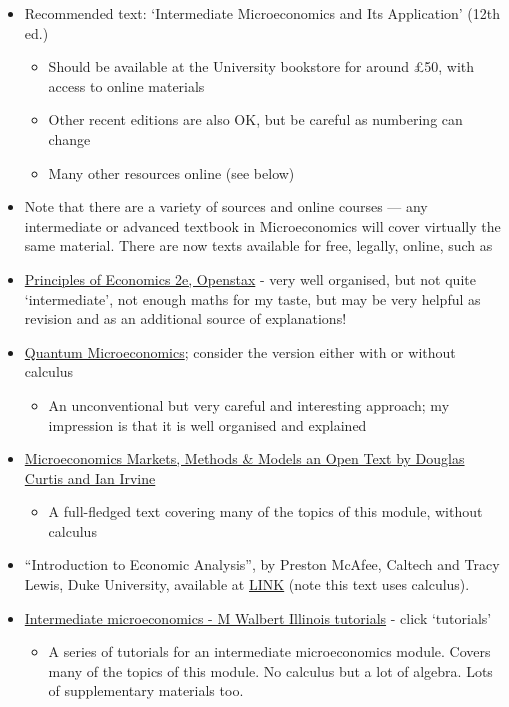 \documentclass[]{article}
\providecommand{\tightlist}{%
  \setlength{\itemsep}{0pt}\setlength{\parskip}{0pt}}
\begin{document}
\begin{itemize}
\item
  Recommended text: `Intermediate Microeconomics and Its Application'
  (12th ed.)

  \begin{itemize}
  \tightlist
  \item
    Should be available at the University bookstore for around
    \pounds50, with access to online materials
  \item
    Other recent editions are also OK, but be careful as numbering can
    change
  \item
    Many other resources online (see below)
  \end{itemize}
\item
  Note that there are a variety of sources and online courses --- any
  intermediate or advanced textbook in Microeconomics will cover
  virtually the same material. There are now texts available for free,
  legally, online, such as
\item
  \href{https://cnx.org/contents/bc498e1f-efe9-43a0-8dea-d3569ad09a82}{Principles
  of Economics 2e, Openstax} - very well organised, but not quite
  `intermediate', not enough maths for my taste, but may be very helpful
  as revision and as an additional source of explanations!
\item
  \href{http://www.smallparty.org/yoram/quantum/\#downloads}{Quantum
  Microeconomics}; consider the version either with or without calculus

  \begin{itemize}
  \tightlist
  \item
    An unconventional but very careful and interesting approach; my
    impression is that it is well organised and explained
  \end{itemize}
\item
  \href{https://laecon1.lyryx.com/textbooks/OPEN_CURTIS_MIC_1/marketing/CurtisIrvine-Microeconomics-2017A.pdf}{Microeconomics
  Markets, Methods \& Models an Open Text by Douglas Curtis and Ian
  Irvine}

  \begin{itemize}
  \tightlist
  \item
    A full-fledged text covering many of the topics of this module,
    without calculus
  \end{itemize}
\item
  ``Introduction to Economic Analysis'', by Preston McAfee, Caltech and
  Tracy Lewis, Duke University, available at
  \href{https://open.umn.edu/opentextbooks/BookDetail.aspx?bookId=47}{LINK}
  (note this text uses calculus).
\item
  \href{http://my.ilstu.edu/~mswalber/ECO240/index.html}{Intermediate
  microeconomics - M Walbert Illinois tutorials} - click `tutorials'

  \begin{itemize}
  \tightlist
  \item
    A series of tutorials for an intermediate microeconomics module.
    Covers many of the topics of this module. No calculus but a lot of
    algebra. Lots of supplementary materials too.
  \end{itemize}
\end{itemize}
\end{document}
